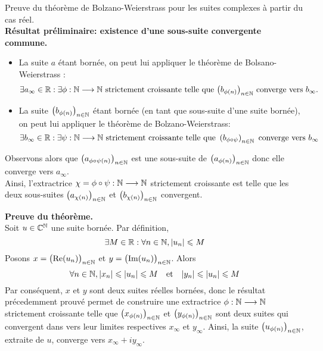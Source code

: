 \documentclass{article}
\date{08 décembre 2024}
\begin{document}
\maketitle

\begin{question_kholle}{Preuve du théorème de Bolzano-Weierstrass
    pour les suites complexes à partir du cas réel.}
  \hfill\\
  \textbf{Résultat préliminaire: existence d’une sous-suite
    convergente commune.}\\
  \begin{itemize}
    \item La suite $a$ étant bornée, on peut lui appliquer le
          théorème de Bolsano-Weierstrass :
          \[
            \exists a_{\infty}\in\mathbb R : \exists \phi: \mathbb N\longrightarrow \mathbb N
            \text{ strictement croissante telle que
              $\left(b_{\phi(n)}\right)_{n\in\mathbb N}$ converge vers $b_{\infty}$.}
          \]
    \item La suite $\left(b_{\phi(n)}\right)_{n\in\mathbb N}$ étant bornée
          (en tant que sous-suite d’une suite bornée), on peut lui
          appliquer le théorème de Bolzano-Weierstrass:
          \[
            \exists b_{\infty}\in\mathbb R: \exists \psi : \mathbb N\longrightarrow \mathbb N
            \text{ strictement croissante telle que } \left(b_{\phi\circ
              \psi}\right)_{n\in\mathbb N} \text{ converge vers $b_{\infty}$}
          \]
  \end{itemize}
  Observons alors que $\left(a_{\phi\circ \psi(n)}\right)_{n\in\mathbb N}$
  est une sous-suite de $\left(a_{\phi(n)}\right)_{n\in\mathbb N}$ donc elle
  converge vers $a_{\infty}$.\\
  Ainsi, l’extractrice $\chi = \phi\circ \psi: \mathbb N\longrightarrow \mathbb N$
  strictement croissante est telle que les deux sous-suites
  $\left(a_{\chi(n)}\right)_{n\in\mathbb N}$ et
  $\left(b_{\chi(n)}\right)_{n\in\mathbb N}$ convergent.

  \textbf{Preuve du théorème.}\\
  Soit $u\in\mathbb C^{\mathbb N}$ une suite bornée. Par définition,
  \[
    \exists M\in\mathbb R : \forall n\in\mathbb N, |u_{n}|\leqslant M
  \]
  Posons $x=\big(\text{Re}(u_{n})\big)_{n\in\mathbb N}$ et
  $y=\big(\text{Im}(u_{n})\big)_{n\in\mathbb N}$. Alors
  \[
    \forall n\in\mathbb N, |x_{n}|\leqslant |u_{n}|\leqslant M \quad \text{et} \quad
    |y_{n}|\leqslant |u_{n}|\leqslant M
  \]
  Par conséquent, $x$ et $y$ sont deux suites réelles bornées, donc
  le résultat précedemment prouvé permet de construire une
  extractrice $\phi:\mathbb N\longrightarrow \mathbb N$ strictement croissante
  telle que $\left(x_{\phi(n)}\right)_{n\in\mathbb N}$ et
  $\left(y_{\phi(n)}\right)_{n\in\mathbb N}$ sont deux suites qui convergent
  dans \R vers leur limites respectives $x_{\infty}$ et $y_{\infty}$.
  Ainsi, la suite $\left(u_{\phi(n)}\right)_{n\in\mathbb N}$, extraite de
  $u$, converge vers $x_{\infty}+iy_{\infty}$.

\end{question_kholle}
\end{document}
